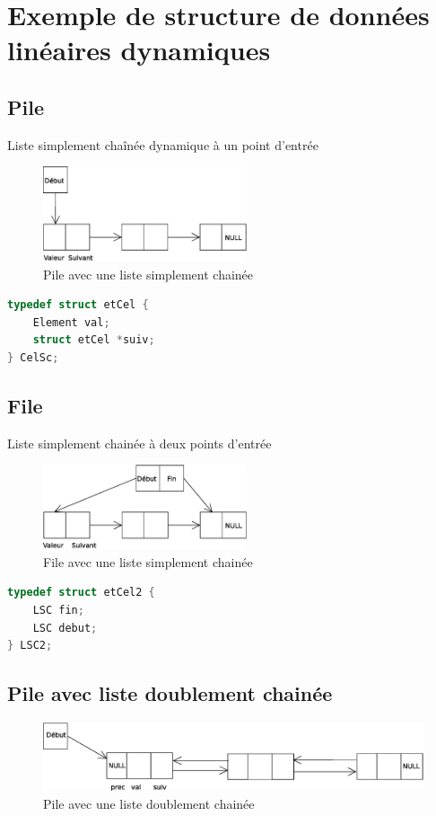 \chapter{Exemple de structure de données linéaires dynamiques}\label{sdDynamique}
\section{Pile}
Liste simplement chaînée dynamique à un point d'entrée

\begin{figure}[H]
	\centering
	\includegraphics[width=6cm]{content/pile.eps}
	\caption{Pile avec une liste simplement chainée}
\end{figure}

\begin{lstlisting}[language=C, numbers=none,frame=none, caption=Stucture \texttt{CelSc} -- Pile avec liste simplement chaînée]
	typedef struct etCel {
	Element val;
	struct etCel *suiv;
} CelSc;
\end{lstlisting}

\section{File}
Liste simplement chainée à deux points d'entrée

\begin{figure}[H]
	\centering
\includegraphics[width=6cm]{content/file.eps}
	\caption{File avec une liste simplement chainée}
\end{figure}
\begin{lstlisting}[language=C, numbers=none,frame=none, caption=Structure \texttt{LSC2} -- File avec liste simplement chaînée]
	typedef struct etCel2 {
	LSC fin;
	LSC debut;
} LSC2;
\end{lstlisting}
\section{Pile avec liste doublement chainée}
\begin{figure}[H]
	\centering
\includegraphics[width=12cm]{content/pileDoubleChaine.eps}
	\caption{Pile avec une liste doublement chainée}
\end{figure}

